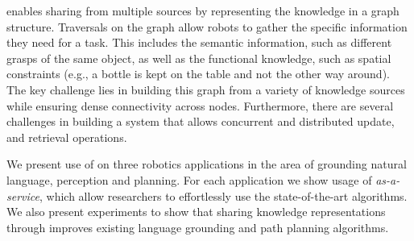 \robobrain{} enables sharing from multiple sources by representing the knowledge in a graph structure.
Traversals on the \robobrain{} graph allow robots to gather the specific information they need for a task. This includes the  semantic information, such as different grasps of the same object, as well as the functional knowledge, such as spatial constraints (e.g., a bottle is kept on the table and not the other way around).
The key challenge lies in building this graph from a variety of knowledge sources while ensuring dense connectivity across nodes. Furthermore, there are several  challenges in building a system that allows concurrent and distributed update, and retrieval operations.

We  present use of \robobrain{} on three robotics applications in the area of grounding natural language, perception and planning.
For each application we show usage of \robobrain{} \textit{as-a-service}, which allow researchers to effortlessly use the state-of-the-art algorithms. We also present experiments to show that sharing knowledge representations through \robobrain{} improves existing language grounding and path planning algorithms.

